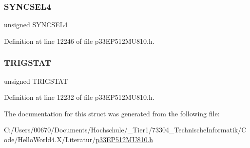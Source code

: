 \mbox{\label{structtag_o_c16_c_o_n2_b_i_t_s_a0cd5bbe196c7974953909d27a6307bb7}} 
\subsubsection{\texorpdfstring{S\+Y\+N\+C\+S\+E\+L4}{SYNCSEL4}}
{\footnotesize\ttfamily unsigned S\+Y\+N\+C\+S\+E\+L4}



Definition at line 12246 of file p33\+E\+P512\+M\+U810.\+h.

\mbox{\label{structtag_o_c16_c_o_n2_b_i_t_s_ab379549de54ac93ad4aa73686c34cb7c}} 
\subsubsection{\texorpdfstring{T\+R\+I\+G\+S\+T\+AT}{TRIGSTAT}}
{\footnotesize\ttfamily unsigned T\+R\+I\+G\+S\+T\+AT}



Definition at line 12232 of file p33\+E\+P512\+M\+U810.\+h.



The documentation for this struct was generated from the following file\+:\begin{DoxyCompactItemize}
\item 
C\+:/\+Users/00670/\+Documents/\+Hochschule/\+\_\+\+Tier1/73304\+\_\+\+Technische\+Informatik/\+Code/\+Hello\+World4.\+X/\+Literatur/\hyperlink{p33_e_p512_m_u810_8h}{p33\+E\+P512\+M\+U810.\+h}\end{DoxyCompactItemize}
